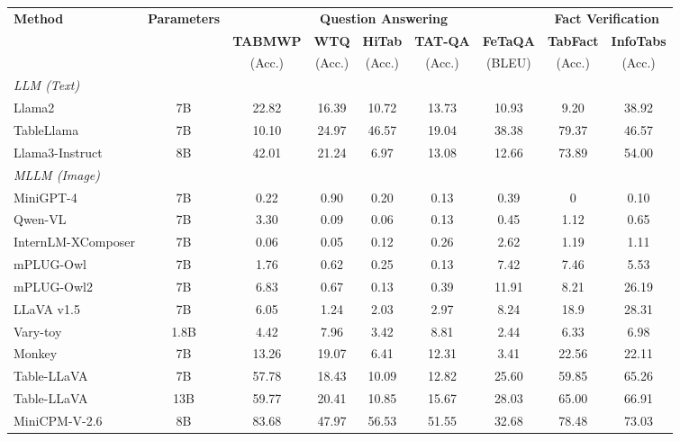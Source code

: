 \begin{table*}[t]
\centering
\small
\begin{tabular}{l|c|ccccc|cc} 
\hline
\multirow{3}{*}{\textbf{Method}} & \multirow{3}{*}{\textbf{Parameters}} & \multicolumn{5}{c|}{\textbf{Question Answering}} & \multicolumn{2}{c}{\textbf{Fact Verification}} \\ \cline{3-9}
 & &  \textbf{TABMWP} & \textbf{WTQ} & \textbf{HiTab} & \textbf{TAT-QA} & \textbf{FeTaQA} & \textbf{TabFact} & \textbf{InfoTabs} \\ 
 & & (Acc.) & (Acc.) & (Acc.) & (Acc.) & (BLEU) & (Acc.) & (Acc.) \\ 
\hline
\multicolumn{9}{l}{{\cellcolor[rgb]{0.957,0.957,0.957}}\textit{LLM (Text)}} \\
Llama2 & 7B & 22.82 & 16.39 & 10.72 & 13.73 & 10.93 & 9.20 & 38.92 \\
TableLlama & 7B & 10.10 & 24.97 & 46.57 & 19.04 & 38.38 & 79.37 & 46.57 \\
Llama3-Instruct & 8B & 42.01 & 21.24 & 6.97 & 13.08 & 12.66 & 73.89 & 54.00 \\
\multicolumn{9}{l}{{\cellcolor[rgb]{0.957,0.957,0.957}}\textit{MLLM (Image)}} \\
MiniGPT-4 & 7B & 0.22 & 0.90 & 0.20 & 0.13 & 0.39 & 0 & 0.10 \\
Qwen-VL & 7B & 3.30 & 0.09 & 0.06 & 0.13 & 0.45 & 1.12 & 0.65 \\
InternLM-XComposer& 7B & 0.06 & 0.05 & 0.12 & 0.26 & 2.62 & 1.19 & 1.11 \\
mPLUG-Owl & 7B & 1.76 & 0.62 & 0.25 & 0.13 & 7.42 & 7.46 & 5.53 \\
mPLUG-Owl2 & 7B & 6.83 & 0.67 & 0.13 & 0.39 & 11.91 & 8.21 & 26.19 \\
LLaVA v1.5 & 7B & 6.05 & 1.24 & 2.03 & 2.97 & 8.24 & 18.9 & 28.31 \\
Vary-toy & 1.8B & 4.42 & 7.96 & 3.42 & 8.81 & 2.44 & 6.33 & 6.98 \\
Monkey & 7B & 13.26 & 19.07 & 6.41 & 12.31 & 3.41 & 22.56 & 22.11 \\
Table-LLaVA  & 7B & 57.78 & 18.43 & 10.09 & 12.82 & 25.60 & 59.85 & 65.26 \\
Table-LLaVA & 13B & 59.77 & 20.41 & 10.85 & 15.67 & 28.03 & 65.00 & 66.91 \\
MiniCPM-V-2.6 & 8B & 83.68  & 47.97 & 56.53 & 51.55 & 32.68 & 78.48 & 73.03 \\


\end{tabular}
\end{table*}
